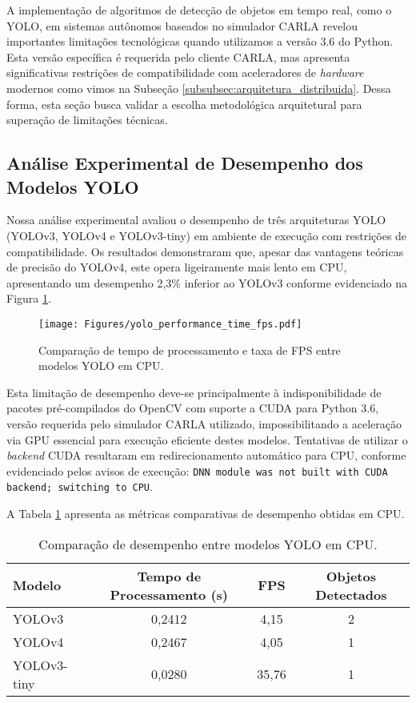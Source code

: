 A implementação de algoritmos de detecção de objetos em tempo real, como o YOLO, em sistemas autônomos baseados no simulador CARLA revelou importantes limitações tecnológicas quando utilizamos a versão 3.6 do Python. Esta versão específica é requerida pelo cliente CARLA, mas apresenta significativas restrições de compatibilidade com aceleradores de \textit{hardware} modernos como vimos na Subseção \ref{subsubsec:arquitetura_distribuida}. Dessa forma, esta seção busca validar a escolha metodológica arquitetural para superação de limitações técnicas.

\subsection{Análise Experimental de Desempenho dos Modelos YOLO}

Nossa análise experimental avaliou o desempenho de três arquiteturas YOLO (YOLOv3, YOLOv4 e YOLOv3-tiny) em ambiente de execução com restrições de compatibilidade. Os resultados demonstraram que, apesar das vantagens teóricas de precisão do YOLOv4, este opera ligeiramente mais lento em CPU, apresentando um desempenho 2,3\% inferior ao YOLOv3 conforme evidenciado na Figura \ref{fig:yolo_time_fps}.

\begin{figure}[H]
\centering
\texttt{[image: Figures/yolo\_performance\_time\_fps.pdf]}
\caption{Comparação de tempo de processamento e taxa de FPS entre modelos YOLO em CPU.}
\label{fig:yolo_time_fps}
\end{figure}

Esta limitação de desempenho deve-se principalmente à indisponibilidade de pacotes pré-compilados do OpenCV com suporte a CUDA para Python 3.6, versão requerida pelo simulador CARLA utilizado, impossibilitando a aceleração via GPU essencial para execução eficiente destes modelos. Tentativas de utilizar o \textit{backend} CUDA resultaram em redirecionamento automático para CPU, conforme evidenciado pelos avisos de execução: \texttt{DNN module was not built with CUDA backend; switching to CPU}.

A Tabela \ref{tab:performance} apresenta as métricas comparativas de desempenho obtidas em CPU.

\begin{table}[h]
\centering
\begin{tabular}{@{}lccc@{}}
\toprule
\textbf{Modelo} & \textbf{Tempo de Processamento (s)} & \textbf{FPS} & \textbf{Objetos Detectados} \\ 
\midrule
YOLOv3 & 0,2412 & 4,15 & 2 \\
YOLOv4 & 0,2467 & 4,05 & 1 \\
YOLOv3-tiny & 0,0280 & 35,76 & 1 \\
\bottomrule
\end{tabular}
\caption{Comparação de desempenho entre modelos YOLO em CPU.}
\label{tab:performance}
\end{table}

